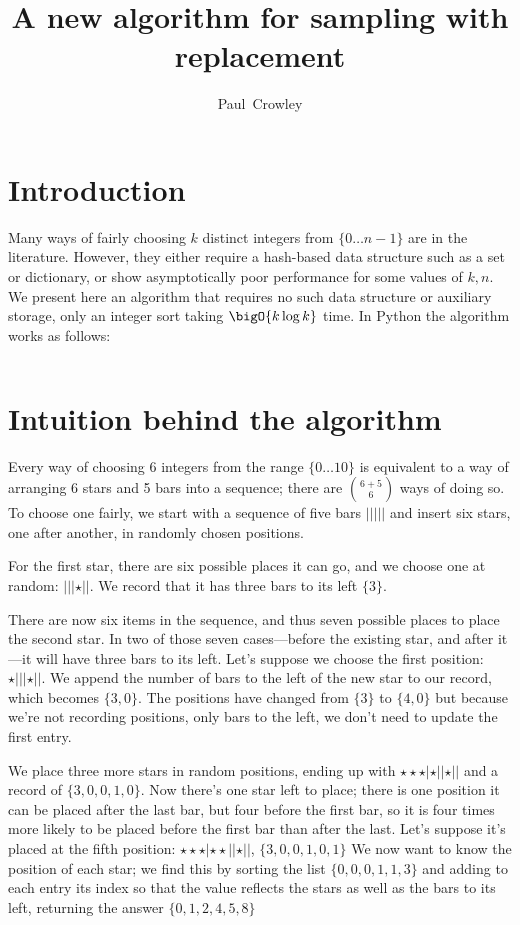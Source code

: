 \documentclass[letterpaper,luatex,11pt]{article}
\title{A new algorithm for sampling with replacement}
\author{Paul~Crowley}
\affil{Google LLC}
\begin{document}
\maketitle

\section{Introduction}

Many ways of fairly choosing $k$ distinct integers from $\{0 \ldots n-1\}$ are in the literature.
However, they either require a hash-based data structure such as a set or dictionary, or
show asymptotically poor performance for some values of $k, n$. We present here an algorithm
that requires no such data structure or auxiliary storage, only an integer sort taking
$\bigO{k \log k}$ time. In Python the algorithm works as follows:

\inputminted{Python}{cardchoose.py}

\section{Intuition behind the algorithm}

Every way of choosing 6 integers from the range $\{0 \ldots 10\}$ is equivalent to a way of
arranging 6 stars and 5 bars into a sequence;
there are $\binom{6 + 5}{6}$ ways of doing so.
To choose one fairly, we start with a sequence of five bars \(|||||\) and insert six stars,
one after another, in randomly chosen positions.

For the first star, there are six possible places it can go, and we choose one at random:
\(|||\star||\). We record that it has three bars to its left \(\{3\}\).

There are now six items in the sequence, and thus seven possible places to place the second star.
In two of those seven cases---before the existing star, and after it---it will have three bars
to its left. Let's suppose we choose the first position: \(\star|||\star||\). We append
the number of bars to the left of the new star to our record, which becomes \(\{3, 0\}\).
The positions have changed from \(\{3\}\)
to \(\{4, 0\}\) but because we're not recording positions, only bars to the left, we don't need to
update the first entry.

We place three more stars in random positions, ending up with \(\star\star\star|\star||\star||\)
and a record of \(\{3, 0, 0, 1, 0\}\). Now there's one star left to place; there is one
position it can be placed after the last bar, but four before the first bar, so it is four times
more likely to be placed before the first bar than after the last. Let's suppose it's placed
at the fifth position: \(\star\star\star|\star\star||\star||\), \(\{3, 0, 0, 1, 0, 1\}\) We now
want to know the position of each star; we find this by sorting the list \(\{0, 0, 0, 1, 1, 3\}\)
and adding to each entry its index so that the value reflects the stars as well as the bars to its
left, returning the answer $\{0, 1, 2, 4, 5, 8\}$
\end{document}
